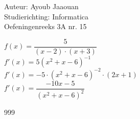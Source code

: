 \documentclass[a4paper]{article}
\begin{document}
\noindent \large Auteur: Ayoub Jaaouan \\
\noindent \large Studierichting: Informatica\\
\noindent \large Oefeningenreeks 3A nr. 15\\

\medskip

\normalsize

$f(x) = \dfrac{5}{(x-2)\cdot(x+3)}$\\

$f'(x) =5(x^2+x-6)^{-1}$\\

$f'(x) =-5\cdot(x^2+x-6)^{-2}\cdot(2x+1)$\\

$f'(x) = \dfrac{-10x-5}{(x^2+x-6)^{2}}$\\





\begin{thebibliography}{999}
\end{thebibliography}
\end{document}

